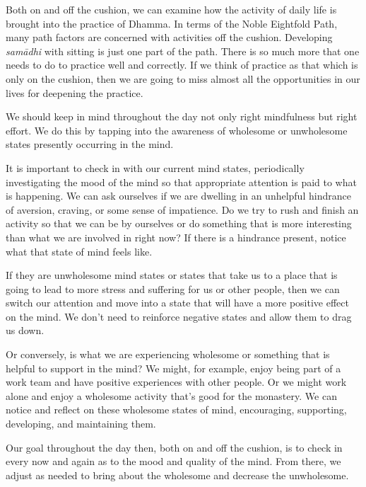 
Both on and off the cushion, we can examine how the activity of daily 
life is brought into the practice of Dhamma. In terms of the Noble 
Eightfold Path, many path factors are concerned with activities off the 
cushion. Developing \emph{samādhi} with sitting is just one part of 
the path. There is so much more that one needs to do to practice well 
and correctly. If we think of practice as that which is only on the 
cushion, then we are going to miss almost all the opportunities in our 
lives for deepening the practice.

We should keep in mind throughout the day not only right mindfulness 
but right effort. We do this by tapping into the awareness of wholesome 
or unwholesome states presently occurring in the mind.

It is important to check in with our current mind states, periodically 
investigating the mood of the mind so that appropriate attention is 
paid to what is happening. We can ask ourselves if we are dwelling in 
an unhelpful hindrance of aversion, craving, or some sense of 
impatience. Do we try to rush and finish an activity so that we can be 
by ourselves or do something that is more interesting than what we are 
involved in right now? If there is a hindrance present, notice what 
that state of mind feels like.

If they are unwholesome mind states or states that take us to a place 
that is going to lead to more stress and suffering for us or other 
people, then we can switch our attention and move into a state that 
will have a more positive effect on the mind. We don't need to 
reinforce negative states and allow them to drag us down.

Or conversely, is what we are experiencing wholesome or something that 
is helpful to support in the mind? We might, for example, enjoy being 
part of a work team and have positive experiences with other people. Or 
we might work alone and enjoy a wholesome activity that's good for the 
monastery. We can notice and reflect on these wholesome states of mind, 
encouraging, supporting, developing, and maintaining them.

Our goal throughout the day then, both on and off the cushion, is to 
check in every now and again as to the mood and quality of the mind. 
From there, we adjust as needed to bring about the wholesome and 
decrease the unwholesome.


